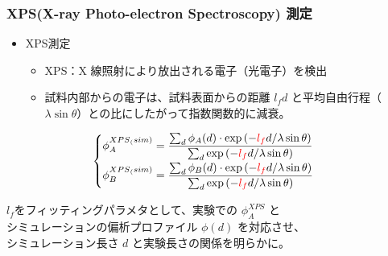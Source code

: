 \documentclass[unicode,12pt]{beamer}%
\begin{document}
\begin{frame}\frametitle{XPS(X-ray Photo-electron Spectroscopy) 測定}

\begin{itemize}
	\item XPS測定
	\begin{itemize}
	\item XPS：X 線照射により放出される電子（光電子）を検出
	\item 試料内部からの電子は、試料表面からの距離 \color{red}$l_{f} d$\color{black} と平均自由行程（\color{red}$\lambda \sin \theta$\color{black}）との比にしたがって\color{red}指数関数的に減衰\color{black}。
	\end{itemize}
\end{itemize}
\begin{equation*}
\begin{cases}
	\phi_A^{{XPS}_(sim)} = 
		\dfrac{\sum_{d} \phi_A(d) \cdot \exp \left(- \color{red}l_{f}\color{black}d/\lambda \sin \theta \right) } 
		{\sum_{d} \exp \left(- \color{red}l_{f}\color{black}d/\lambda \sin \theta \right)} \\[8pt]
	\phi_B^{{XPS}_(sim)} = 
		\dfrac{\sum_{d} \phi_B(d) \cdot \exp \left(- \color{red}l_{f}\color{black}d/\lambda \sin \theta \right) } 
		{\sum_{d} \exp \left(- \color{red}l_{f}\color{black}d/\lambda \sin \theta \right)}
\end{cases}
\end{equation*}


\begin{block}{}
\color{red}$l_f$\color{black}をフィッティングパラメタとして、実験での \color{red}$\phi_A^{XPS}$\color{black} と\\
シミュレーションの偏析プロファイル\color{red} $\phi(d)$ を対応\color{black}させ、\\
シミュレーション長さ\color{red} $d$ と実験長さの関係\color{black}を明らかに。
\end{block}
\end{frame}
\end{document}
